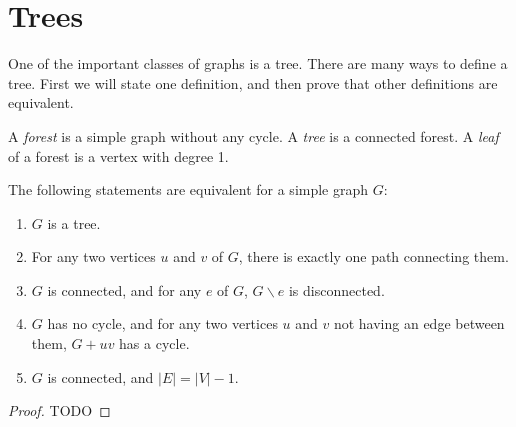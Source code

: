     \section{Trees}
        One of the important classes of graphs is a tree. There are many ways to define a tree. First we will state one definition, and then prove that other definitions are equivalent.
        \begin{defn}[Tree] \label{def_tree}
            A \emph{forest} is a simple graph without any cycle. A \emph{tree} is a connected forest. A \emph{leaf} of a forest is a vertex with degree 1.
        \end{defn}
        
        \begin{thm} \label{thm_tree}
            The following statements are equivalent for a simple graph $G$: \begin{enumerate}
                \item $G$ is a tree.
                \item For any two vertices $u$ and $v$ of $G$, there is exactly one path connecting them.
                \item $G$ is connected, and for any $e$ of $G$, $G \backslash e$ is disconnected.
                \item $G$ has no cycle, and for any two vertices $u$ and $v$ not having an edge between them, $G+uv$ has a cycle.
                \item $G$ is connected, and $|E| = |V|-1$.
            \end{enumerate}
        \end{thm}

        \begin{proof}
            TODO
            
            
        \end{proof}
        
